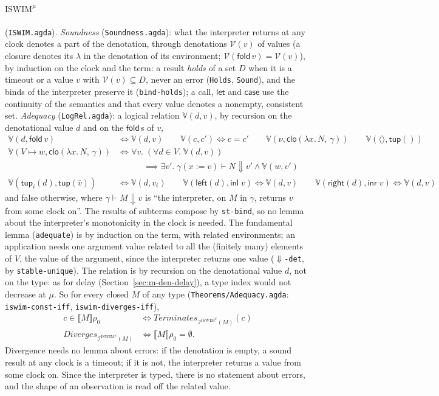 \documentclass[10pt]{article}
\theoremstyle{acmplain}
\newcommand{\SEM}[1]{\llbracket #1 \rrbracket}
\newcommand{\key}[1]{\mathsf{#1}}
\newcommand{\lam}[1]{\lambda #1.\,}
\newcommand{\tup}[2]{\key{tup}_{#1}(#2)}
\newcommand{\Left}[1]{\key{left}(#1)}
\newcommand{\Right}[1]{\key{right}(#1)}
\newcommand{\emptytup}{\langle\rangle}
\newcommand{\ext}[3]{#1(#2{:=}#3)}
\newcommand{\Term}{\mathit{Terminates}}
\newcommand{\Div}{\mathit{Diverges}}
\newcommand{\cloV}[2]{\key{clo}(#1,\, #2)}
\newcommand{\tupV}[1]{\key{tup}(#1)}
\newcommand{\inlV}{\key{inl}\;}
\newcommand{\inrV}{\key{inr}\;}
\newcommand{\Interp}[1]{\mathcal{I}^{#1}}
\newcommand{\Ml}[1]{\textrm{#1}^{\mu}}                  %
\newcommand{\Mfold}{\key{fold}\,}
\begin{document}
\paragraph{$\Ml{ISWIM}$} (\texttt{ISWIM.agda}). \emph{Soundness}
(\texttt{Soundness.agda}): what the interpreter returns at any clock
denotes a part of the denotation, through denotations $\mathcal{V}(v)$ of
values (a closure denotes its $\lambda$ in the denotation of its
environment; $\mathcal{V}(\Mfold v) = \mathcal{V}(v)$), by induction on
the clock and the term: a result \emph{holds} of a set $D$ when it is a
timeout or a value $v$ with $\mathcal{V}(v) \subseteq D$, never an error
(\texttt{Holds}, \texttt{Sound}), and the binds of the interpreter
preserve it (\texttt{bind-holds}); a call, $\key{let}$ and $\key{case}$
use the continuity of the semantics and that every value denotes a
nonempty, consistent set. \emph{Adequacy} (\texttt{LogRel.agda}): a
logical relation $\mathbb{V}(d, v)$, by recursion on the denotational value
$d$ and on the $\Mfold$s of $v$,
\begin{align*}
  \mathbb{V}(d, \Mfold v) &\iff \mathbb{V}(d, v) \qquad
  \mathbb{V}(c, c') \iff c = c' \qquad
  \mathbb{V}(\nu, \cloV{\lam{x} N}{\gamma}) \qquad
  \mathbb{V}(\emptytup, \tupV{}) \\
  \mathbb{V}(V \mapsto w, \cloV{\lam{x} N}{\gamma}) &\iff \forall v.\; (\forall d \in V.\; \mathbb{V}(d, v)) \\
    &\qquad\quad \implies \exists v'.\; \ext{\gamma}{x}{v} \vdash N \Downarrow v' \land \mathbb{V}(w, v') \\
  \mathbb{V}(\tup{i}{d}, \tupV{\bar{v}}) &\iff \mathbb{V}(d, v_i) \qquad
  \mathbb{V}(\Left{d}, \inlV v) \iff \mathbb{V}(d, v) \qquad
  \mathbb{V}(\Right{d}, \inrV v) \iff \mathbb{V}(d, v)
\end{align*}
and false otherwise, where $\gamma \vdash M \Downarrow v$ is ``the
interpreter, on $M$ in $\gamma$, returns $v$ from some clock on''. The
results of subterms compose by \texttt{st-bind}, so no lemma about the
interpreter's monotonicity in the clock is needed. The fundamental lemma
(\texttt{adequate}) is by induction on the term, with related environments;
an application needs one argument value related to all the (finitely many)
elements of $V$, the value of the argument, since the interpreter returns
one value (\texttt{$\Downarrow$-det}, by \texttt{stable-unique}). The relation is by recursion on
the denotational value $d$, not on the type: as for delay
(Section~\ref{sec:m-den-delay}), a type index would not decrease at $\mu$.
So for every closed $M$ of any type
(\texttt{Theorems/\allowbreak Adequacy.agda}: \texttt{iswim-const-iff},
\texttt{iswim-diverges-iff}),
\begin{align*}
  c \in \SEM{M}\rho_0 &\iff \Term_{\Interp{\Ml{ISWIM}}(M)}(c) \\
  \Div_{\Interp{\Ml{ISWIM}}(M)} &\iff \SEM{M}\rho_0 = \emptyset .
\end{align*}
Divergence needs no lemma about errors: if the denotation is empty, a
sound result at any clock is a timeout; if it is not, the interpreter
returns a value from some clock on. Since the interpreter is typed, there
is no statement about errors, and the shape of an observation is read
off the related value.
\end{document}
